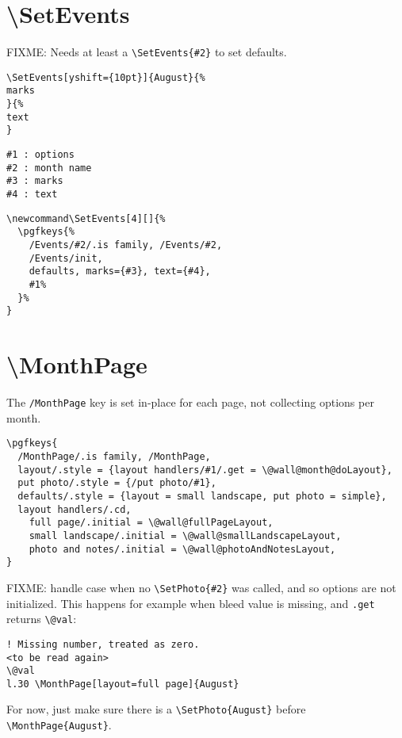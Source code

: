 \documentclass[11pt,oneside]{memoir-article}
\begin{document}
\section{\textbackslash SetEvents}
\label{sec:org393f173}

FIXME: Needs at least a \texttt{\textbackslash{}SetEvents\{\#2\}} to set defaults.

\begin{verbatim}
\SetEvents[yshift={10pt}]{August}{%
marks
}{%
text
}
\end{verbatim}

\begin{verbatim}
#1 : options
#2 : month name
#3 : marks
#4 : text
\end{verbatim}

\begin{verbatim}
\newcommand\SetEvents[4][]{%
  \pgfkeys{%
    /Events/#2/.is family, /Events/#2,
    /Events/init,
    defaults, marks={#3}, text={#4},
    #1%
  }%
}
\end{verbatim}

\section{\textbackslash MonthPage}
\label{sec:org9768eb2}

The \texttt{/MonthPage} key is set in-place for each page, not collecting options per month.

\begin{verbatim}
\pgfkeys{
  /MonthPage/.is family, /MonthPage,
  layout/.style = {layout handlers/#1/.get = \@wall@month@doLayout},
  put photo/.style = {/put photo/#1},
  defaults/.style = {layout = small landscape, put photo = simple},
  layout handlers/.cd,
    full page/.initial = \@wall@fullPageLayout,
    small landscape/.initial = \@wall@smallLandscapeLayout,
    photo and notes/.initial = \@wall@photoAndNotesLayout,
}
\end{verbatim}

FIXME: handle case when no \texttt{\textbackslash{}SetPhoto\{\#2\}} was called, and so options are not
initialized. This happens for example when bleed value is missing, and \texttt{.get}
returns \texttt{\textbackslash{}@val}:

\begin{verbatim}
! Missing number, treated as zero.
<to be read again> 
\@val 
l.30 \MonthPage[layout=full page]{August}
\end{verbatim}

For now, just make sure there is a \texttt{\textbackslash{}SetPhoto\{August\}} before \texttt{\textbackslash{}MonthPage\{August\}}.
\end{document}
